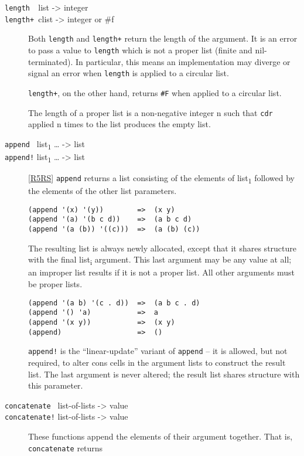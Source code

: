 \begin{description}
\item[ \href{}{} \texttt{length~~}list -\textgreater{} integer\\
\href{}{} \texttt{length+~}clist -\textgreater{} integer or \#f ]
Both \texttt{length} and \texttt{length+} return the length of the
argument. It is an error to pass a value to \texttt{length} which is not
a proper list (finite and nil-terminated). In particular, this means an
implementation may diverge or signal an error when \texttt{length} is
applied to a circular list.

\texttt{length+}, on the other hand, returns \texttt{\#F} when applied
to a circular list.

The length of a proper list is a non-negative integer n such that
\texttt{cdr} applied n times to the list produces the empty list.
\item[ \href{}{} \texttt{append~} list\textsubscript{1} \ldots{}
-\textgreater{} list\\
\href{}{} \texttt{append!} list\textsubscript{1} \ldots{}
-\textgreater{} list ]
{[}\protect\hyperlink{R5RS}{R5RS}{]} \texttt{append} returns a list
consisting of the elements of list\textsubscript{1} followed by the
elements of the other list parameters.

\begin{verbatim}
(append '(x) '(y))        =>  (x y)
(append '(a) '(b c d))    =>  (a b c d)
(append '(a (b)) '((c)))  =>  (a (b) (c))
\end{verbatim}

The resulting list is always newly allocated, except that it shares
structure with the final list\textsubscript{i} argument. This last
argument may be any value at all; an improper list results if it is not
a proper list. All other arguments must be proper lists.

\begin{verbatim}
(append '(a b) '(c . d))  =>  (a b c . d)
(append '() 'a)           =>  a
(append '(x y))           =>  (x y)
(append)                  =>  ()
\end{verbatim}

\texttt{append!} is the ``linear-update'' variant of \texttt{append} --
it is allowed, but not required, to alter cons cells in the argument
lists to construct the result list. The last argument is never altered;
the result list shares structure with this parameter.
\item[ \href{}{} \texttt{concatenate~} list-of-lists -\textgreater{}
value\\
\href{}{} \texttt{concatenate!} list-of-lists -\textgreater{} value ]
These functions append the elements of their argument together. That is,
\texttt{concatenate} returns


\end{description}
